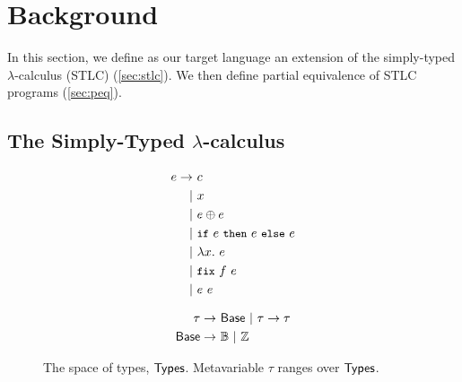 \section{Background}
\label{sec:background}
%
In this section, we define as our target language an extension of the
simply-typed $\lambda$-calculus (STLC) (\autoref{sec:stlc}).
%
We then define partial equivalence of STLC programs
(\autoref{sec:peq}).

\subsection{The Simply-Typed $\lambda$-calculus}
\label{sec:stlc}
\begin{figure}[t]
  \begin{minipage}{0.48\linewidth}
    \begin{align*}
      e \rightarrow &\ c \\
      | &\ x \\
      | &\ e \oplus e \\
      | &\ \ite{ e }{ e }{ e } \\
      | &\ \lambda x.\ e \\
      | &\ \fix{ f }{ e } \\
      | &\ e\ e 
    \end{align*}
    \caption{The space of program expressions, $\expr$.
      Metavariable $e$ ranges over $\expr$.} %
    \label{fig:exprs}
  \end{minipage}
  \begin{minipage}{0.48\linewidth}
    \begin{align*} %
      \tau \rightarrow &\ \base\ %
      |\ \tau \to \tau \\
      \base \rightarrow &\ \bools\ %
      |\ \ints
    \end{align*}
    \caption{The space of types, $\mathsf{Types}$.
      Metavariable $\tau$ ranges over $\mathsf{Types}$.} %
    \label{fig:types}
  \end{minipage}
\end{figure}

